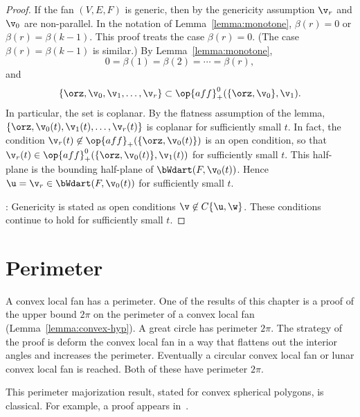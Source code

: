\begin{proof}
If the fan $(V,E,F)$ is generic, then
by the genericity assumption $\v_r$ and
$\v_0$ are non-parallel.  In the notation of
Lemma~\ref{lemma:monotone}, $\beta(r) = 0$ or $\beta(r) =
\beta(k-1)$.  This proof treats the case $\beta(r)=0$. (The case
$\beta(r)=\beta(k-1)$ is similar.)  By Lemma~\ref{lemma:monotone},
\begin{displaymath}0=\beta(1)=\beta(2)=\cdots=\beta(r),\end{displaymath}
and 
\begin{displaymath}
\{\orz,\v_0,\v_1,\ldots,\v_r\} \subset \op{aff}^0_+(\{\orz,\v_0\},\v_1).
\end{displaymath}
In particular, the set is coplanar.  By the flatness assumption of
the lemma, $\{\orz,\v_0(t),\v_1(t),\ldots,\v_r(t)\}$ is coplanar for
sufficiently small $t$.  In fact, the condition $\v_r(t)\not\in
\op{aff}_+(\{\orz,\v_0(t)\})$ is an open condition, so that
$\v_r(t)\in \op{aff}^0_+(\{\orz,\v_0(t)\},\v_1(t))$ for sufficiently
small $t$.  This half-plane is the bounding half-plane of
$\bWdart(F,\v_0(t))$.  Hence $\u = \v_r\in \bWdart(F,\v_0(t))$ for
sufficiently small $t$.

: Genericity is stated as open conditions $\v\not\in
C\{\u,\w\}$.  These conditions continue to hold for sufficiently small
$t$.
\end{proof}






\section{Perimeter}

A convex local fan has a perimeter.  One of the results of this
chapter is a proof of the upper bound $2\pi$ on the perimeter of a
convex local fan (Lemma~\ref{lemma:convex-hyp}).  A great circle has
perimeter $2\pi$.  The strategy of the proof is deform the convex
local fan in a way that flattens out the interior angles and increases
the perimeter.  Eventually a circular convex local fan or lunar convex
local fan is reached.  Both of these have perimeter $2\pi$.

This perimeter majorization result, stated for convex spherical
polygons, is classical.  For example, a proof appears
in~\cite{unknown}.



